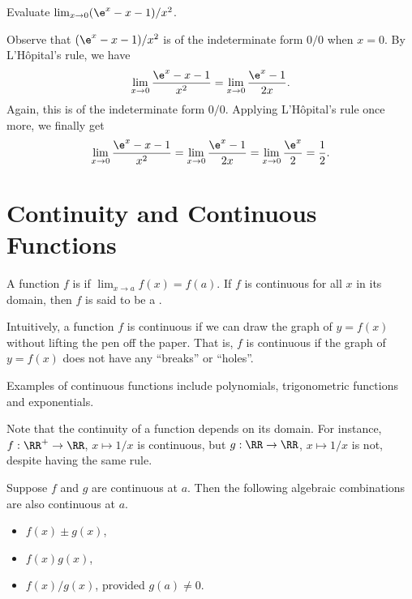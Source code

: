 \begin{sample}
    Evaluate $\lim_{x \to 0} (\e^x - x - 1)/x^2$.
\end{sample}
\begin{sampans}
    Observe that $(\e^x - x - 1)/x^2$ is of the indeterminate form $0/0$ when $x = 0$. By L'H\^{o}pital's rule, we have \[\lim_{x \to 0} \frac{\e^x - x - 1}{x^2} = \lim_{x \to 0} \frac{\e^x - 1}{2x}.\] Again, this is of the indeterminate form $0/0$. Applying L'H\^{o}pital's rule once more, we finally get \[\lim_{x \to 0} \frac{\e^x - x - 1}{x^2} = \lim_{x \to 0} \frac{\e^x - 1}{2x} = \lim_{x \to 0} \frac{\e^x}{2} = \frac12.\]
\end{sampans}

\section{Continuity and Continuous Functions}

\begin{definition}
    A function $f$ is  if $\lim_{x \to a} f(x) = f(a)$. If $f$ is continuous for all $x$ in its domain, then $f$ is said to be a .
\end{definition}

Intuitively, a function $f$ is continuous if we can draw the graph of $y = f(x)$ without lifting the pen off the paper. That is, $f$ is continuous if the graph of $y = f(x)$ does not have any ``breaks'' or ``holes''.

Examples of continuous functions include polynomials, trigonometric functions and exponentials.

Note that the continuity of a function depends on its domain. For instance, $f : \RR^+ \to \RR$, $x \mapsto 1/x$ is continuous, but $g : \RR \to \RR$, $x \mapsto 1/x$ is not, despite having the same rule.

\begin{fact}
    Suppose $f$ and $g$ are continuous at $a$. Then the following algebraic combinations are also continuous at $a$.
    \begin{itemize}
        \item $f(x) \pm g(x)$,
        \item $f(x) g(x)$,
        \item $f(x)/g(x)$, provided $g(a) \neq 0$.
    \end{itemize}
\end{fact}

